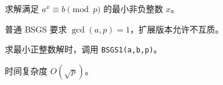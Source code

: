 求解满足 $a^x\equiv b \pmod{p}$ 的最小非负整数 $x$。

普通 BSGS 要求 $\gcd(a,p)=1$，扩展版本允许不互质。

求最小正整数解时，调用 \texttt{BSGS1(a,b,p)}。

时间复杂度 $O(\sqrt{p})$。